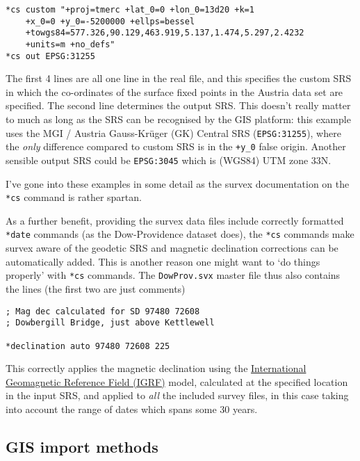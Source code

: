 \documentclass[]{article}
\begin{document}
\begin{verbatim}
*cs custom "+proj=tmerc +lat_0=0 +lon_0=13d20 +k=1 
    +x_0=0 +y_0=-5200000 +ellps=bessel 
    +towgs84=577.326,90.129,463.919,5.137,1.474,5.297,2.4232 
    +units=m +no_defs"
*cs out EPSG:31255
\end{verbatim}

The first 4 lines are all one line in the real file, and this 
specifies the custom SRS in which the co-ordinates of the
surface fixed points in the Austria data set are specified. The second
line determines the output SRS. This doesn't really matter to much as
long as the SRS can be recognised by the GIS platform: this example uses
the MGI / Austria Gauss-Kr\"uger (GK) Central SRS (\verb+EPSG:31255+), where the
\emph{only} difference compared to custom SRS is in the \verb:+y_0: false
origin. Another sensible output SRS could be \verb}EPSG:3045} which
is (WGS84) UTM zone 33N.

I've gone into these examples in some detail as the survex documentation
on the \verb}*cs} command is rather spartan.

As a further benefit, providing the survex data files include correctly
formatted \verb}*date} commands (as the Dow-Providence dataset does),
the \verb}*cs} commands make survex aware of the geodetic SRS and
magnetic declination corrections can be automatically added. This is
another reason one might want to `do things properly' with \verb}*cs}
commands. The \verb}DowProv.svx} master file thus also contains the
lines (the first two are just comments)

\begin{verbatim}
; Mag dec calculated for SD 97480 72608
; Dowbergill Bridge, just above Kettlewell

*declination auto 97480 72608 225
\end{verbatim}

This correctly applies the magnetic declination using the
\href{https://en.wikipedia.org/wiki/International_Geomagnetic_Reference_Field}{International
Geomagnetic Reference Field (IGRF)} model, calculated at the specified
location in the input SRS, and applied to \emph{all} the included survey
files, in this case taking into account the range of dates which spans
some 30 years.

\subsection{GIS import methods}\label{gis-import-methods}
\end{document}
